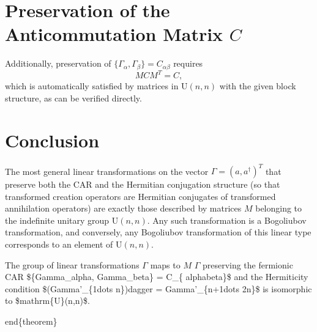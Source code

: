 \documentclass[aps,pre,twocolumn,floatfix,superscriptaddress,10pt]{revtex4}
\begin{document}
\section{Preservation of the Anticommutation Matrix $C$}

Additionally, preservation of $\{\Gamma_\alpha, \Gamma_\beta\} =
C_{\alpha\beta}$ requires 
\begin{equation}
M C M^T = C,
\end{equation}
which is automatically satisfied by matrices in $\mathrm{U}(n,n)$ with the
given block structure, as can be verified directly.

\section{Conclusion}

The most general linear transformations on the vector $\Gamma = (a,
a^\dagger)^T$ that preserve both the CAR and the Hermitian conjugation
structure (so that transformed creation operators are Hermitian conjugates
of transformed annihilation operators) are exactly those described by
matrices $M$ belonging to the indefinite unitary group $\mathrm{U}(n,n)$.
Any such transformation is a Bogoliubov transformation, and conversely, any
Bogoliubov transformation of this linear type corresponds to an element of $%
\mathrm{U}(n,n)$.

\begin{theorem}
The group of linear transformations $\Gamma $ maps to $M$ $\Gamma $%
preserving the fermionic CAR \$\TEXTsymbol{\backslash}\{\TEXTsymbol{%
\backslash}Gamma\_\TEXTsymbol{\backslash}alpha, \TEXTsymbol{\backslash}%
Gamma\_\TEXTsymbol{\backslash}beta\TEXTsymbol{\backslash}\} = C\_\{%
\TEXTsymbol{\backslash}alpha\TEXTsymbol{\backslash}beta\}\$ and the
Hermiticity condition \$(\TEXTsymbol{\backslash}Gamma'\_\{1\TEXTsymbol{%
\backslash}dots n\})\TEXTsymbol{\backslash}dagger = \TEXTsymbol{%
\backslash}Gamma'\_\{n+1\TEXTsymbol{\backslash}dots 2n\}\$ is isomorphic to
\$\TEXTsymbol{\backslash}mathrm\{U\}(n,n)\$.
\end{theorem}

\TEXTsymbol{\backslash}end\{theorem\}
\end{document}

